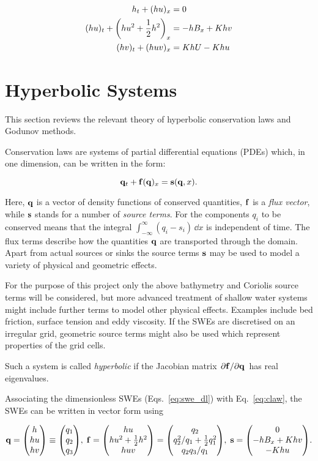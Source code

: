 \begin{subequations}
  \label{eq:swe_dlU}
  \begin{align}
    h_{t} + (h u)_{x} & = 0 \\
    (hu)_{t} + \qty(hu^2 + \frac{1}{2} h^2)_{x} & = - hB_{x} + Khv \\
    (hv)_{t} + (huv)_{x} & = KhU-Khu
  \end{align}
\end{subequations}

\section{Hyperbolic Systems}

This section reviews the relevant theory of hyperbolic conservation laws and Godunov methods.

Conservation laws are systems of partial differential equations (PDEs) which, in one dimension, can be written in the form:

\begin{equation}
  \vb q_t + \vb f(\vb q)_x = \vb s(\vb q, x).
  \label{eq:claw}
\end{equation}

Here, $\vb q$ is a vector of density functions of conserved quantities, $\vb f$ is a \emph{flux vector}, while $\vb s$ stands for a number of \emph{source terms}. For the components $q_i$ to be conserved means that the integral $\int_{-\infty}^\infty (q_i - s_i)\,\dd x$ is independent of time. The flux terms describe how the quantities $\vb q$ are transported through the domain. Apart from actual sources or sinks the source terms $\vb s$ may be used to model a variety of physical and geometric effects.

For the purpose of this project only the above bathymetry and Coriolis source terms will be considered, but more advanced treatment of shallow water systems might include further terms to model other physical effects. Examples include bed friction, surface tension and eddy viscosity. If the SWEs are discretised on an irregular grid, geometric source terms might also be used which represent properties of the grid cells.

Such a system is called \emph{hyperbolic} if the Jacobian matrix $\pdv*{\vb f}{\vb q}$ has real eigenvalues.

Associating the dimensionless SWEs (Eqs.~\ref{eq:swe_dl}) with Eq.~\ref{eq:claw}, the SWEs can be written in vector form using

$$
  \vb q = \mqty( h \\ hu \\ hv ) \equiv \mqty( q_1 \\ q_2 \\ q_3 ),\;
  \vb f = \mqty( hu \\ hu^2 + \frac{1}{2}h^2 \\ huv ) = \mqty( q_2 \\ q_2^2/q_1 + \frac{1}{2}q_1^2 \\ q_2q_3/q_1 ),\;
  \vb s = \mqty( 0 \\ - hB_x + Khv \\ - Khu ).
$$

